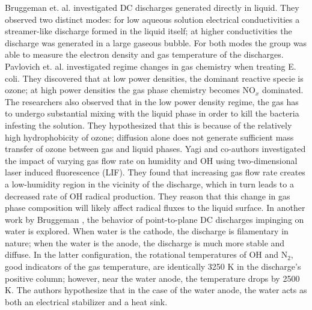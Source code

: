 Bruggeman et. al. \cite{Bruggeman2009d} investigated DC discharges generated directly in liquid. They observed two distinct modes: for low aqueous solution electrical conductivities a streamer-like discharge formed in the liquid itself; at higher conductivities the discharge was generated in a large gaseous bubble. For both modes the group was able to measure the electron density and gas temperature of the discharges. Pavlovich et. al. \cite{Pavlovich2013g} investigated regime changes in gas chemistry when treating E. coli. They discovered that at low power densities, the dominant reactive specie is ozone; at high power densities the gas phase chemistry becomes NO$_x$ dominated. The researchers also observed that in the low power density regime, the gas has to undergo substantial mixing with the liquid phase in order to kill the bacteria infesting the solution. They hypothesized that this is because of the relatively high hydrophobicity of ozone; diffusion alone does not generate sufficient mass transfer of ozone between gas and liquid phases. Yagi and co-authors investigated the impact of varying gas flow rate on humidity and OH using two-dimensional laser induced fluorescence (LIF). \cite{yagi2015two} They found that increasing gas flow rate creates a low-humidity region in the vicinity of the discharge, which in turn leads to a decreased rate of OH radical production. They reason that this change in gas phase composition will likely affect radical fluxes to the liquid surface. In another work by Bruggeman \cite{bruggeman2008dc}, the behavior of point-to-plane DC discharges impinging on water is explored. When water is the cathode, the discharge is filamentary in nature; when the water is the anode, the discharge is much more stable and diffuse. In the latter configuration, the rotational temperatures of OH and N$_2$, good indicators of the gas temperature, are identically 3250 K in the discharge's positive column; however, near the water anode, the temperature drops by 2500 K. The authors hypothesize that in the case of the water anode, the water acts as both an electrical stabilizer and a heat sink.

